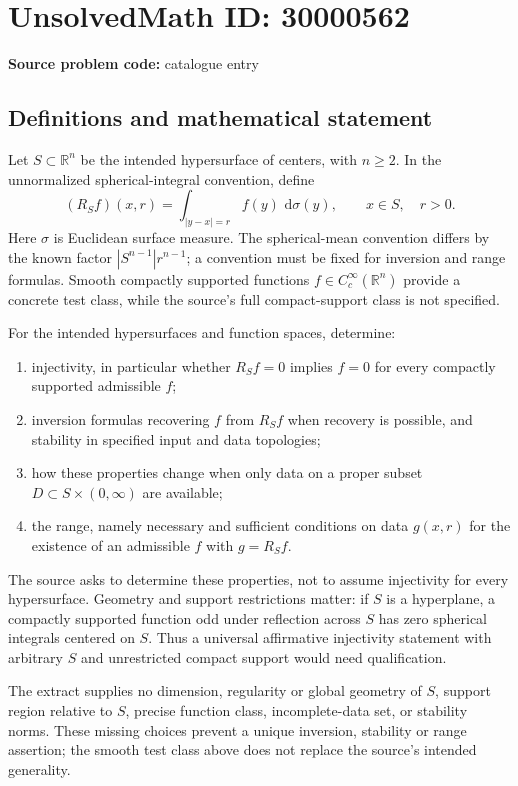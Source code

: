 \documentclass[11pt]{article}
\newcommand{\R}{\mathbb{R}}
\newcommand{\dd}{\,\mathrm{d}}
\begin{document}
\section*{UnsolvedMath ID: 30000562}
\textbf{Source problem code:} catalogue entry
\subsection{Definitions and mathematical statement}
Let $S\subset\R^n$ be the intended hypersurface of centers, with $n\geq2$. In the unnormalized spherical-integral convention, define
\[
(R_Sf)(x,r)=\int_{|y-x|=r}f(y)\,\dd\sigma(y),
\qquad x\in S,\quad r>0.
\]
Here $\sigma$ is Euclidean surface measure. The spherical-mean convention differs by the known factor $|S^{n-1}|r^{n-1}$; a convention must be fixed for inversion and range formulas. Smooth compactly supported functions $f\in C_c^\infty(\R^n)$ provide a concrete test class, while the source's full compact-support class is not specified.

For the intended hypersurfaces and function spaces, determine:
\begin{enumerate}
\item injectivity, in particular whether $R_Sf=0$ implies $f=0$ for every compactly supported admissible $f$;
\item inversion formulas recovering $f$ from $R_Sf$ when recovery is possible, and stability in specified input and data topologies;
\item how these properties change when only data on a proper subset $D\subset S\times(0,\infty)$ are available;
\item the range, namely necessary and sufficient conditions on data $g(x,r)$ for the existence of an admissible $f$ with $g=R_Sf$.
\end{enumerate}
The source asks to determine these properties, not to assume injectivity for every hypersurface. Geometry and support restrictions matter: if $S$ is a hyperplane, a compactly supported function odd under reflection across $S$ has zero spherical integrals centered on $S$. Thus a universal affirmative injectivity statement with arbitrary $S$ and unrestricted compact support would need qualification.

The extract supplies no dimension, regularity or global geometry of $S$, support region relative to $S$, precise function class, incomplete-data set, or stability norms. These missing choices prevent a unique inversion, stability or range assertion; the smooth test class above does not replace the source's intended generality.
\end{document}
